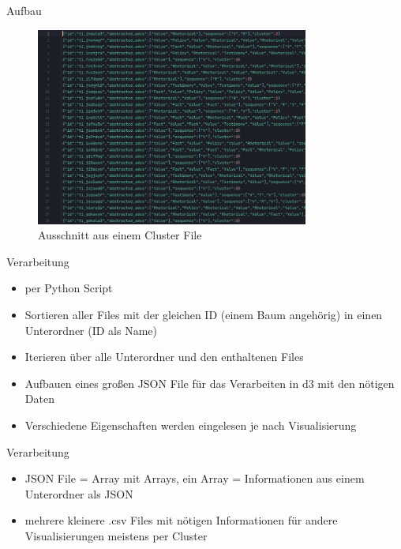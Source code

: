 \documentclass[compress,12pt]{beamer}
\begin{document}
    \begin{frame}{Aufbau}
        \begin{figure}
            \centering
            \includegraphics[width=0.8\textwidth]{../images/cluster-file-example}
            \caption{Ausschnitt aus einem Cluster File}
            \label{fig:cluster-file-example}
        \end{figure}
    \end{frame}

    \begin{frame}{Verarbeitung}
        \begin{itemize}
            \item per Python Script
            \item Sortieren aller Files mit der gleichen ID (einem Baum angehörig) in einen Unterordner (ID als Name)
            \item Iterieren über alle Unterordner und den enthaltenen Files
            \item Aufbauen eines großen JSON File für das Verarbeiten in d3 mit den nötigen Daten
            \item Verschiedene Eigenschaften werden eingelesen je nach Visualisierung
        \end{itemize}
    \end{frame}

    \begin{frame}{Verarbeitung}
        \begin{itemize}
            \item JSON File = Array mit Arrays, ein Array = Informationen aus einem Unterordner als JSON
            \item mehrere kleinere .csv Files mit nötigen Informationen für andere Visualisierungen \textrightarrow meistens per Cluster
        \end{itemize}
    \end{frame}
\end{document}
